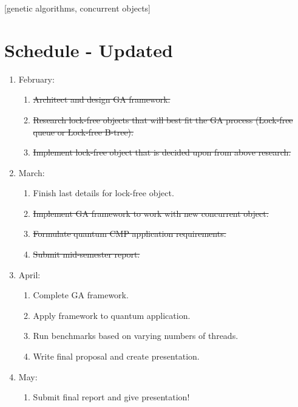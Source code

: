 \documentclass{acm_proc_article-sp}
\begin{document}
%
%
[genetic algorithms, concurrent objects]


%
%
\section{Schedule - Updated}
\begin{enumerate}

\item{
February:
}
\begin{enumerate}
\item \sout{Architect and design GA framework.}
\item \sout{Research lock-free objects that will best fit the GA process (Lock-free queue or Lock-free B-tree).}
\item \sout{Implement lock-free object that is decided upon from above research.}
\end{enumerate}

\item{
March:
}
\begin{enumerate}
\item Finish last details for lock-free object.
\item \sout{Implement GA framework to work with new concurrent object.}
\item \sout{Formulate quantum CMP application requirements.}
\item \sout{Submit mid-semester report.}
\end{enumerate}


\item{
April:
}
\begin{enumerate}
\item Complete GA framework.
\item Apply framework to quantum application.
\item Run benchmarks based on varying numbers of threads.
\item Write final proposal and create presentation.
\end{enumerate}


\item{
May:
}
\begin{enumerate}
\item Submit final report and give presentation!
\end{enumerate}


\end{enumerate}


%
%
\end{document}
